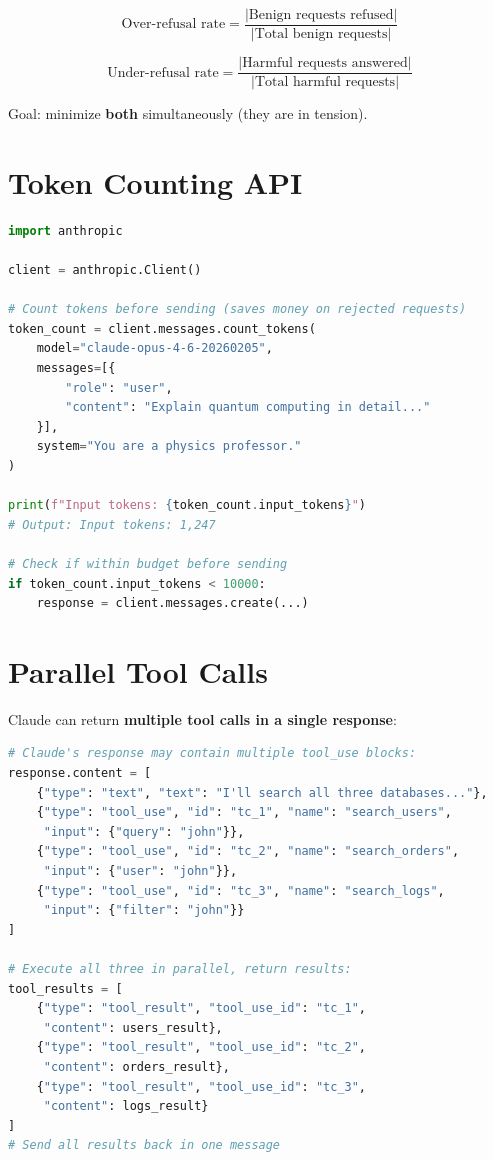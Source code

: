 \documentclass[11pt,a4paper]{article}
\begin{document}
$$\text{Over-refusal rate} = \frac{|\text{Benign requests refused}|}{|\text{Total benign requests}|}$$

$$\text{Under-refusal rate} = \frac{|\text{Harmful requests answered}|}{|\text{Total harmful requests}|}$$

Goal: minimize \textbf{both} simultaneously (they are in tension).

\section{Token Counting API}

\begin{lstlisting}[language=Python, caption={Token Counting Before Sending}]
import anthropic

client = anthropic.Client()

# Count tokens before sending (saves money on rejected requests)
token_count = client.messages.count_tokens(
    model="claude-opus-4-6-20260205",
    messages=[{
        "role": "user",
        "content": "Explain quantum computing in detail..."
    }],
    system="You are a physics professor."
)

print(f"Input tokens: {token_count.input_tokens}")
# Output: Input tokens: 1,247

# Check if within budget before sending
if token_count.input_tokens < 10000:
    response = client.messages.create(...)
\end{lstlisting}

\section{Parallel Tool Calls}

Claude can return \textbf{multiple tool calls in a single response}:

\begin{lstlisting}[language=Python, caption={Parallel Tool Calls}]
# Claude's response may contain multiple tool_use blocks:
response.content = [
    {"type": "text", "text": "I'll search all three databases..."},
    {"type": "tool_use", "id": "tc_1", "name": "search_users",
     "input": {"query": "john"}},
    {"type": "tool_use", "id": "tc_2", "name": "search_orders", 
     "input": {"user": "john"}},
    {"type": "tool_use", "id": "tc_3", "name": "search_logs",
     "input": {"filter": "john"}}
]

# Execute all three in parallel, return results:
tool_results = [
    {"type": "tool_result", "tool_use_id": "tc_1", 
     "content": users_result},
    {"type": "tool_result", "tool_use_id": "tc_2",
     "content": orders_result},
    {"type": "tool_result", "tool_use_id": "tc_3",
     "content": logs_result}
]
# Send all results back in one message
\end{lstlisting}
\end{document}
